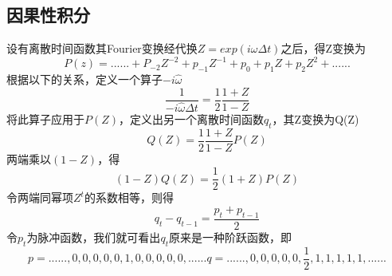 \subsection{因果性积分}
\label{sec:4.6.4}

设有离散时间函数其Fourier变换经代换$Z=exp(i\omega \Delta t)$之后，得Z变换为
\begin{equation}
P(z)=......+P_{-2}Z^{-2}+p_{-1}Z^{-1}+p_0+p_1Z+p_2Z^2+......
\label{eq:ex4.6.8}
\end{equation}
根据以下的关系，定义一个算子$-i\hat{\omega}$
\begin{equation}
\frac{1}{-i\hat{\omega}\Delta t}=\frac{1}{2}\frac{1+Z}{1-Z}
\label{eq:ex4.6.9}
\end{equation}
将此算子应用于$P(Z)$，定义出另一个离散时间函数$q_t$，其Z变换为Q(Z)
\begin{equation}
Q(Z)=\frac{1}{2}\frac{1+Z}{1-Z}P(Z)
\label{eq:ex4.6.10}
\end{equation}
两端乘以$(1-Z)$，得
\begin{equation}
(1-Z)Q(Z)=\frac{1}{2}(1+Z)P(Z)
\label{eq:ex4.6.11}
\end{equation}
令两端同幂项$Z^t$的系数相等，则得
\begin{equation}
q_t-q_{t-1}=\frac{p_t+p_{t-1}}{2}
\label{eq:ex4.6.12}
\end{equation}
令$p_t$为脉冲函数，我们就可看出$q_t$原来是一种阶跃函数，即
\begin{subequations}
\begin{equation}
p=......,0,0,0,0,0,1,0,0,0,0,0,......
\label{eq:ex4.6.13a}
\end{equation}
\begin{equation}
q=......,0,0,0,0,0,\frac{1}{2},1,1,1,1,1,......
\label{eq:ex4.6.13b}
\end{equation}
\label{eq:ex4.6.13}
\end{subequations}

